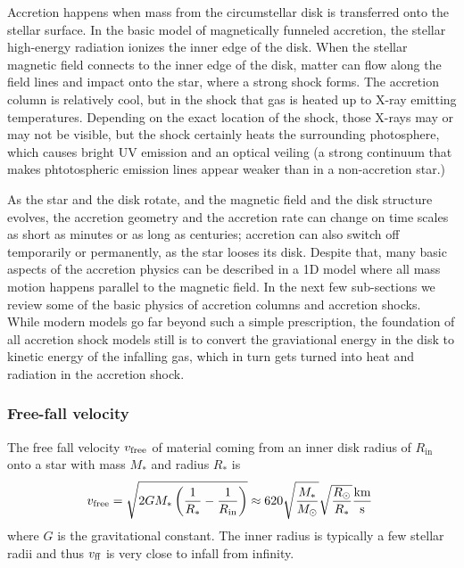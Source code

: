 \documentclass[graybox, nosecnum]{svmult}
\begin{document}
Accretion happens when mass from the circumstellar disk is transferred onto the stellar surface. In the basic model of magnetically funneled accretion, the stellar high-energy radiation ionizes the inner edge of the disk. When the stellar magnetic field connects to the inner edge of the disk, matter can flow along the field lines and impact onto the star, where a strong shock forms. The accretion column is relatively cool, but in the shock that gas is heated up to X-ray emitting temperatures. Depending on the exact location of the shock, those X-rays may or may not be visible, but the shock certainly heats the surrounding photosphere, which causes bright UV emission and an optical veiling (a strong continuum that makes phtotospheric emission lines appear weaker than in a non-accretion star.)

As the star and the disk rotate, and the magnetic field and the disk structure evolves, the accretion geometry and the accretion rate can change on time scales as short as minutes or as long as centuries; accretion can also switch off temporarily or permanently, as the star looses its disk. Despite that, many basic aspects of the accretion physics can be described in a 1D model where all mass motion happens parallel to the magnetic field. In the next few sub-sections we review some of the basic physics of accretion columns and accretion shocks. While modern models go far beyond such a simple prescription, the foundation of all accretion shock models still is to convert the graviational energy in the disk to kinetic energy of the infalling gas, which in turn gets turned into heat and radiation in the accretion shock.

\subsubsection{Free-fall velocity}
The free fall velocity $v_{\textnormal{free}}$ of material coming from an inner disk radius of $R_\mathrm{in}$ onto a star with mass $M_*$ and radius $R_*$ is
\begin{equation} 
v_{\textnormal{free}} = \sqrt{{2GM_*} \left(\frac{1}{R_*} - \frac{1}{R_\mathrm{in}}\right)} \approx 620 \sqrt{\frac{M_*}{M_\odot}}\sqrt{\frac{R_\odot}{R_*}} \frac{\textnormal{km}}{\textnormal{s}}\ \label{eqn:freefall} 
\end{equation}
where $G$ is the gravitational constant. The inner radius is typically a few stellar radii and thus $v_\textnormal{ff}$ is very close to infall from infinity.
\end{document}
